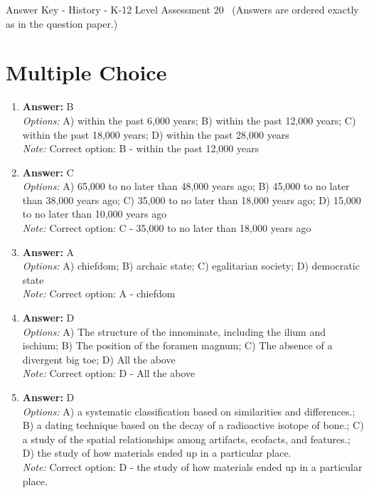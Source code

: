 \documentclass[12pt]{article}
\begin{document}
\begin{center}
Answer Key - History - K-12 Level Assessment 20 \
\small (Answers are ordered exactly as in the question paper.)
\end{center}

\section*{Multiple Choice}
\begin{enumerate}[label=\arabic*.]
\item \textbf{Answer:} B
\\ \textit{Options:} A) within the past 6,000 years; B) within the past 12,000 years; C) within the past 18,000 years; D) within the past 28,000 years
\\ \textit{Note:} Correct option: B - within the past 12,000 years
\item \textbf{Answer:} C
\\ \textit{Options:} A) 65,000 to no later than 48,000 years ago; B) 45,000 to no later than 38,000 years ago; C) 35,000 to no later than 18,000 years ago; D) 15,000 to no later than 10,000 years ago
\\ \textit{Note:} Correct option: C - 35,000 to no later than 18,000 years ago
\item \textbf{Answer:} A
\\ \textit{Options:} A) chiefdom; B) archaic state; C) egalitarian society; D) democratic state
\\ \textit{Note:} Correct option: A - chiefdom
\item \textbf{Answer:} D
\\ \textit{Options:} A) The structure of the innominate, including the ilium and ischium; B) The position of the foramen magnum; C) The absence of a divergent big toe; D) All the above
\\ \textit{Note:} Correct option: D - All the above
\item \textbf{Answer:} D
\\ \textit{Options:} A) a systematic classification based on similarities and differences.; B) a dating technique based on the decay of a radioactive isotope of bone.; C) a study of the spatial relationships among artifacts, ecofacts, and features.; D) the study of how materials ended up in a particular place.
\\ \textit{Note:} Correct option: D - the study of how materials ended up in a particular place.
\end{enumerate}
\end{document}
